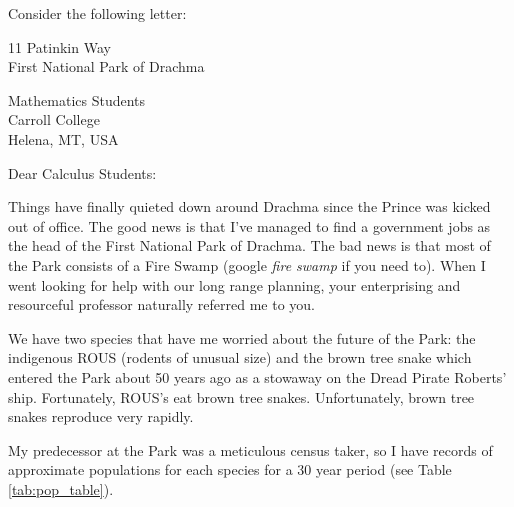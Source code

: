 \begin{lab}
   Consider the following letter:
\begin{flushright}
    11 Patinkin Way \\
    First National Park of Drachma \\
\end{flushright}
\begin{flushleft}
    Mathematics Students \\
    Carroll College \\
    Helena, MT, USA
\end{flushleft}

\noindent Dear Calculus Students:

Things have finally quieted down around Drachma since the Prince was kicked out of office.
The good news is that I've managed to find a government jobs as the head of the First
National Park of Drachma.  The bad news is that most of the Park consists of a Fire Swamp
(google {\it fire swamp} if you need to).  When I went looking for help with our long
range planning, your enterprising and resourceful professor naturally referred me to you.

We have two species that have me worried about the future of the Park: the indigenous ROUS
(rodents of unusual size) and the brown tree snake which entered the Park about 50 years
ago as a stowaway on the Dread Pirate Roberts' ship.  Fortunately, ROUS's eat brown tree snakes.
Unfortunately, brown tree snakes reproduce very rapidly.

My predecessor at the Park was a meticulous census taker, so I have records of approximate
populations for each species for a 30 year period (see Table \ref{tab:pop_table}).


\end{lab}
